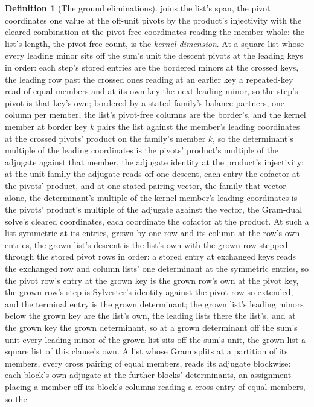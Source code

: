 \documentclass[11pt]{article}
\theoremstyle{definition}
\newtheorem{definition}{Definition}
\begin{document}
\begin{definition}[The ground eliminations]
joins the list's span, the pivot coordinates one value at the
off-unit pivots by the product's injectivity with the cleared
combination at the pivot-free coordinates reading the member
whole: the list's length, the pivot-free
count, is the \emph{kernel dimension}. At a square list whose
every leading minor sits off the sum's unit the descent pivots at
the leading keys in order: each step's stored entries are the
bordered minors at the crossed keys, the leading row past the
crossed ones reading at an earlier key a repeated-key read of equal
members and at its own key the next leading minor, so the step's
pivot is that key's own; bordered by a stated family's balance partners, one
column per member, the list's pivot-free columns are the border's,
and the kernel member at border key $k$ pairs the list against the
member's leading coordinates at the crossed pivots' product on the
family's member $k$, so the determinant's multiple of the leading
coordinates is the pivots' product's multiple of the adjugate
against that member, the adjugate identity at the product's
injectivity: at the unit family the adjugate reads off one descent,
each entry the cofactor at the pivots' product, and at one stated
pairing vector, the family that vector alone, the determinant's
multiple of the kernel member's leading coordinates is the pivots'
product's multiple of the adjugate against the vector, the
Gram-dual solve's cleared coordinates, each coordinate the cofactor
at the product. At such a list symmetric at its entries, grown by
one row and its column at the row's own entries, the grown list's
descent is the list's own with the grown row stepped through the
stored pivot rows in order: a stored entry at exchanged keys reads
the exchanged row and column lists' one determinant at the
symmetric entries, so the pivot row's entry at the grown key is
the grown row's own at the pivot key, the grown row's step is
Sylvester's identity against the pivot row so extended, and the
terminal entry is the grown determinant; the grown list's leading
minors below the grown key are the list's own, the leading lists
there the list's, and at the grown key the grown determinant, so
at a grown determinant off the sum's unit every leading minor of
the grown list sits off the sum's unit, the grown list a square
list of this clause's own. A list whose Gram splits at
a partition of its members, every cross pairing of equal members,
reads its adjugate blockwise: each block's own adjugate at the
further blocks' determinants, an assignment placing a member off
its block's columns reading a cross entry of equal members, so the

\end{definition}
\end{document}
